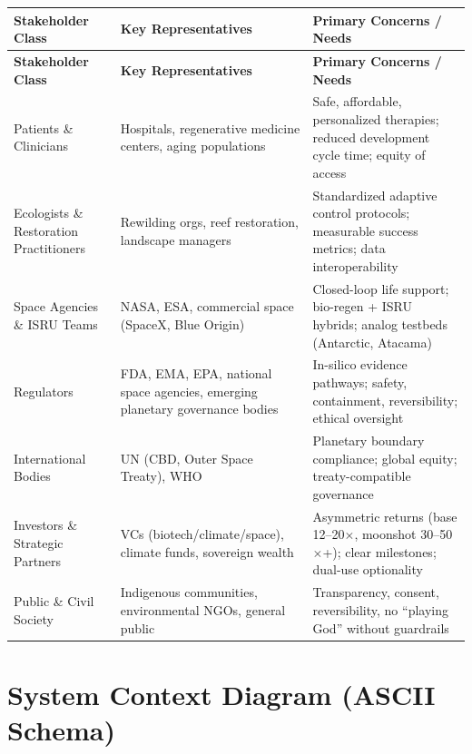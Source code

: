 \documentclass[11pt,a4paper]{report}
\begin{document}
\begin{longtable}{>{\raggedright\arraybackslash}p{3.2cm} p{4.5cm} p{6cm}}
\toprule
\textbf{Stakeholder Class} & \textbf{Key Representatives} & \textbf{Primary Concerns / Needs} \\
\midrule
\endfirsthead
\toprule
\textbf{Stakeholder Class} & \textbf{Key Representatives} & \textbf{Primary Concerns / Needs} \\
\midrule
\endhead
\bottomrule
\endfoot
Patients \& Clinicians & Hospitals, regenerative medicine centers, aging populations & Safe, affordable, personalized therapies; reduced development cycle time; equity of access \\
Ecologists \& Restoration Practitioners & Rewilding orgs, reef restoration, landscape managers & Standardized adaptive control protocols; measurable success metrics; data interoperability \\
Space Agencies \& ISRU Teams & NASA, ESA, commercial space (SpaceX, Blue Origin) & Closed-loop life support; bio-regen + ISRU hybrids; analog testbeds (Antarctic, Atacama) \\
Regulators & FDA, EMA, EPA, national space agencies, emerging planetary governance bodies & In-silico evidence pathways; safety, containment, reversibility; ethical oversight \\
International Bodies & UN (CBD, Outer Space Treaty), WHO & Planetary boundary compliance; global equity; treaty-compatible governance \\
Investors \& Strategic Partners & VCs (biotech/climate/space), climate funds, sovereign wealth & Asymmetric returns (base 12--20$\times$, moonshot 30--50$\times$+); clear milestones; dual-use optionality \\
Public \& Civil Society & Indigenous communities, environmental NGOs, general public & Transparency, consent, reversibility, no ``playing God'' without guardrails \\
\end{longtable}

\section{System Context Diagram (ASCII Schema)}
\end{document}
